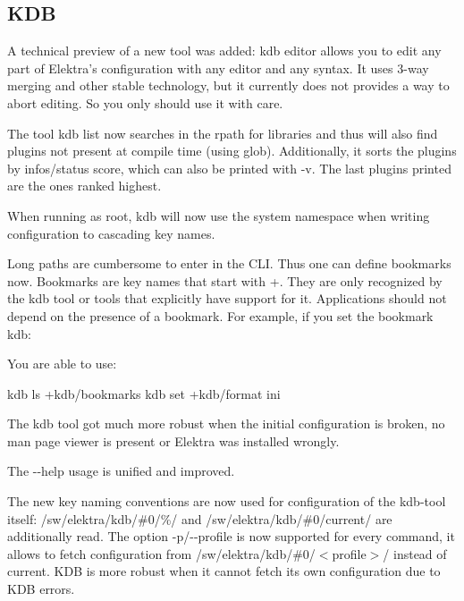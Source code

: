\subsection*{K\+DB}

A technical preview of a new tool was added\+: {\ttfamily kdb editor} allows you to edit any part of Elektra’s configuration with any editor and any syntax. It uses 3-\/way merging and other stable technology, but it currently does not provides a way to abort editing. So you only should use it with care.

The tool {\ttfamily kdb list} now searches in the rpath for libraries and thus will also find plugins not present at compile time (using {\ttfamily glob}). Additionally, it sorts the plugins by {\ttfamily infos/status} score, which can also be printed with {\ttfamily -\/v}. The last plugins printed are the ones ranked highest.

When running as root, {\ttfamily kdb} will now use the {\ttfamily system} namespace when writing configuration to cascading key names.

Long paths are cumbersome to enter in the C\+LI. Thus one can define bookmarks now. Bookmarks are key names that start with {\ttfamily +}. They are only recognized by the {\ttfamily kdb} tool or tools that explicitly have support for it. Applications should not depend on the presence of a bookmark. For example, if you set the bookmark kdb\+: 


You are able to use\+: \begin{DoxyVerb}kdb ls +kdb/bookmarks
kdb set +kdb/format ini
\end{DoxyVerb}


The kdb tool got much more robust when the initial configuration is broken, no man page viewer is present or Elektra was installed wrongly.

The {\ttfamily -\/-\/help} usage is unified and improved.

The new key naming conventions are now used for configuration of the {\ttfamily kdb}-\/tool itself\+: {\ttfamily /sw/elektra/kdb/\#0/\%/} and {\ttfamily /sw/elektra/kdb/\#0/current/} are additionally read. The option {\ttfamily -\/p}/{\ttfamily -\/-\/profile} is now supported for every command, it allows to fetch configuration from {\ttfamily /sw/elektra/kdb/\#0/$<$profile$>$/} instead of {\ttfamily current}. K\+DB is more robust when it cannot fetch its own configuration due to K\+DB errors.

